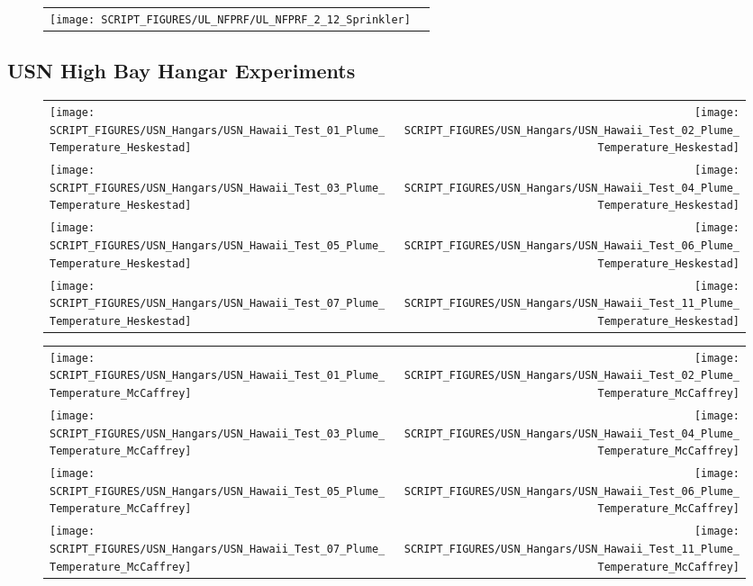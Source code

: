 \begin{figure}[p]
\begin{tabular*}{\textwidth}{l@{\extracolsep{\fill}}r}
\texttt{[image: SCRIPT\_FIGURES/UL\_NFPRF/UL\_NFPRF\_2\_12\_Sprinkler]}
\end{tabular*}
\end{figure}

\clearpage

\subsection{USN High Bay Hangar Experiments}

\begin{figure}[p]
\begin{tabular*}{\textwidth}{l@{\extracolsep{\fill}}r}
\texttt{[image: SCRIPT\_FIGURES/USN\_Hangars/USN\_Hawaii\_Test\_01\_Plume\_Temperature\_Heskestad]} &
\texttt{[image: SCRIPT\_FIGURES/USN\_Hangars/USN\_Hawaii\_Test\_02\_Plume\_Temperature\_Heskestad]} \\
\texttt{[image: SCRIPT\_FIGURES/USN\_Hangars/USN\_Hawaii\_Test\_03\_Plume\_Temperature\_Heskestad]} &
\texttt{[image: SCRIPT\_FIGURES/USN\_Hangars/USN\_Hawaii\_Test\_04\_Plume\_Temperature\_Heskestad]} \\
\texttt{[image: SCRIPT\_FIGURES/USN\_Hangars/USN\_Hawaii\_Test\_05\_Plume\_Temperature\_Heskestad]} &
\texttt{[image: SCRIPT\_FIGURES/USN\_Hangars/USN\_Hawaii\_Test\_06\_Plume\_Temperature\_Heskestad]} \\
\texttt{[image: SCRIPT\_FIGURES/USN\_Hangars/USN\_Hawaii\_Test\_07\_Plume\_Temperature\_Heskestad]} &
\texttt{[image: SCRIPT\_FIGURES/USN\_Hangars/USN\_Hawaii\_Test\_11\_Plume\_Temperature\_Heskestad]}
\end{tabular*}
\end{figure}

\begin{figure}[p]
\begin{tabular*}{\textwidth}{l@{\extracolsep{\fill}}r}
\texttt{[image: SCRIPT\_FIGURES/USN\_Hangars/USN\_Hawaii\_Test\_01\_Plume\_Temperature\_McCaffrey]} &
\texttt{[image: SCRIPT\_FIGURES/USN\_Hangars/USN\_Hawaii\_Test\_02\_Plume\_Temperature\_McCaffrey]} \\
\texttt{[image: SCRIPT\_FIGURES/USN\_Hangars/USN\_Hawaii\_Test\_03\_Plume\_Temperature\_McCaffrey]} &
\texttt{[image: SCRIPT\_FIGURES/USN\_Hangars/USN\_Hawaii\_Test\_04\_Plume\_Temperature\_McCaffrey]} \\
\texttt{[image: SCRIPT\_FIGURES/USN\_Hangars/USN\_Hawaii\_Test\_05\_Plume\_Temperature\_McCaffrey]} &
\texttt{[image: SCRIPT\_FIGURES/USN\_Hangars/USN\_Hawaii\_Test\_06\_Plume\_Temperature\_McCaffrey]} \\
\texttt{[image: SCRIPT\_FIGURES/USN\_Hangars/USN\_Hawaii\_Test\_07\_Plume\_Temperature\_McCaffrey]} &
\texttt{[image: SCRIPT\_FIGURES/USN\_Hangars/USN\_Hawaii\_Test\_11\_Plume\_Temperature\_McCaffrey]}
\end{tabular*}
\end{figure}

